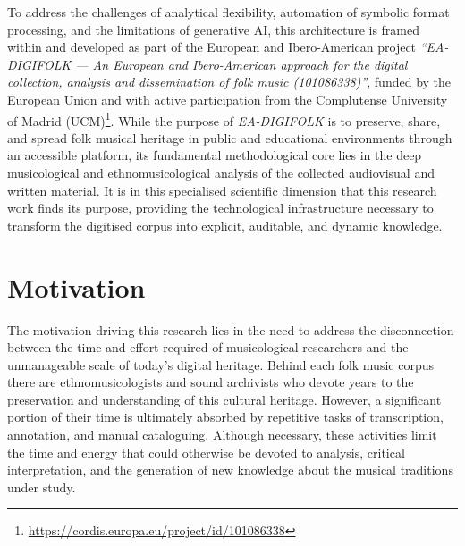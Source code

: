 To address the challenges of analytical flexibility, automation of symbolic format processing, and the limitations of generative AI, this architecture is framed within and developed as part of the European and Ibero-American project \textit{“EA-DIGIFOLK — An European and Ibero-American approach for the digital collection, analysis and dissemination of folk music (101086338)”}, funded by the European Union and with active participation from the Complutense University of Madrid (UCM)\footnote{\url{https://cordis.europa.eu/project/id/101086338}}. While the purpose of \textit{EA-DIGIFOLK} is to preserve, share, and spread folk musical heritage in public and educational environments through an accessible platform, its fundamental methodological core lies in the deep musicological and ethnomusicological analysis of the collected audiovisual and written material. It is in this specialised scientific dimension that this research work finds its purpose, providing the technological infrastructure necessary to transform the digitised corpus into explicit, auditable, and dynamic knowledge.

\section{Motivation}


The motivation driving this research lies in the need to address the disconnection between the time and effort required of musicological researchers and the unmanageable scale of today’s digital heritage. Behind each folk music corpus there are ethnomusicologists and sound archivists who devote years to the preservation and understanding of this cultural heritage. However, a significant portion of their time is ultimately absorbed by repetitive tasks of transcription, annotation, and manual cataloguing. Although necessary, these activities limit the time and energy that could otherwise be devoted to analysis, critical interpretation, and the generation of new knowledge about the musical traditions under study.

